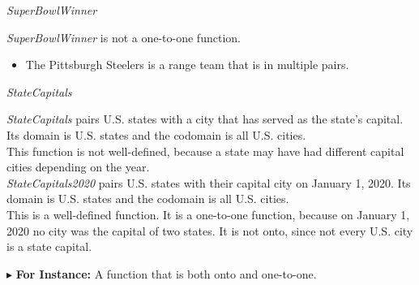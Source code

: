 \documentclass{ximera}
\begin{document}
\begin{example} \textit{SuperBowlWinner}


\textit{SuperBowlWinner} is not a one-to-one function.


\begin{itemize}
\item The Pittsburgh Steelers is a range team that is in multiple pairs. 
\end{itemize}

\end{example}












\begin{example} \textit{StateCapitals}


\textit{StateCapitals} pairs U.S. states with a city that has served as the state's capital. Its domain is U.S. states and the codomain is all U.S. cities.\\



This function is not well-defined, because a state may have had different capital cities depending on the year. \\


\textit{StateCapitals2020} pairs U.S. states with their capital city on January 1, 2020. Its domain is U.S. states and the codomain is all U.S. cities.\\


This is a well-defined function.  It is a one-to-one function, because on January 1, 2020 no city was the capital of two states.  It is not onto, since not every U.S. city is a state capital.


\end{example}












$\blacktriangleright$ \textbf{For Instance:} A function that is both onto and one-to-one.  \\
\end{document}
